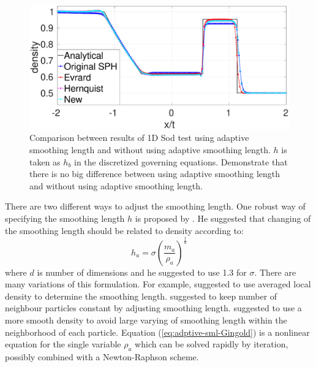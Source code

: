 \begin{figure}[h]
\center
\begin{minipage}{.5\textwidth}
        \centering
        \includegraphics[width=0.99 \textwidth]{./Chapter-3/Figures/SM-Adapt-MEs}
\end{minipage}
\caption{Comparison between results of 1D Sod test using adaptive smoothing length and without using adaptive smoothing length. $h$ is taken as $h_b$ in the discretized governing equations. Demonstrate that there is no big difference between using adaptive smoothing length and without using adaptive smoothing length.}
    \label{fig:GSPH-sod-adapt-vs-no}
\end{figure}

There are two different ways to adjust the smoothing length.
One robust way of specifying the smoothing length $h$ is proposed by \citet{gingold1978binary}. He suggested that changing of the smoothing length should be related to density according to: 
\begin{equation}
h_a = \sigma \left(\frac{m_a}{\rho_a}\right)^{\frac{1}{d}}
\label{eq:adptive-sml-Gingold}
\end{equation}
where $d$ is number of dimensions and he suggested to use 1.3 for $\sigma$.
There are many variations of this formulation. For example, \citet{steinmetz1993capabilities} suggested to use averaged local density to determine the smoothing length. \citet{hernquist1989treesph} suggested to keep number of neighbour particles constant by adjusting smoothing length. \citet{inutsuka2002reformulation} suggested to use a more smooth density to avoid large varying of smoothing length within the neighborhood of each particle.
Equation (\ref{eq:adptive-sml-Gingold}) is a nonlinear equation for the single variable $\rho_a$  which can be solved rapidly by iteration, possibly combined with a Newton-Raphson scheme.

